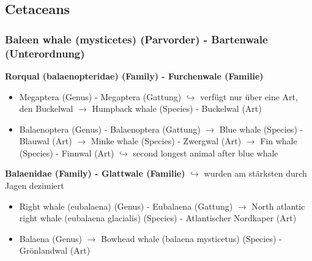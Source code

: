 \documentclass[12pt,a4paper]{article}
\begin{document}
\subsection{Cetaceans} %
\label{sub:cetaceans}

\subsubsection{Baleen whale (mysticetes) (Parvorder) - Bartenwale (Unterordnung)} %
\label{ssub:baleen_whale_mysticetes_parvorder_bartenwale_unterordnung_}

\textbf{Rorqual (balaenopteridae) (Family) - Furchenwale (Familie)}
\begin{itemize}
  \item Megaptera (Genus) - Megaptera (Gattung) 
  \newline \indent $\hookrightarrow$ verfügt nur über eine Art, den Buckelwal
      \newline \indent $\longrightarrow$ Humpback whale (Species) - Buckelwal (Art)
\end{itemize}
\begin{itemize}
  \item Balaenoptera (Genus) - Balaenoptera (Gattung)
    \newline \indent $\longrightarrow$ Blue whale (Species) - Blauwal (Art)
    \newline \indent $\longrightarrow$ Minke whale (Species) - Zwergwal (Art)
    \newline \indent $\longrightarrow$ Fin whale (Species) - Finnwal (Art)
    \newline \indent $\hookrightarrow$ second longest animal after blue whale 
\end{itemize}

\textbf{Balaenidae (Family) - Glattwale (Familie) }
\newline \indent $\hookrightarrow$ wurden am stärksten durch Jagen dezimiert
\begin{itemize}
  \item Right whale (eubalaena) (Genus) - Eubalaena (Gattung)
    \newline \indent $\longrightarrow$ North atlantic right whale (eubalaena glacialis) (Species) - Atlantischer Nordkaper (Art)

  \item Balaena (Genus)
    \newline \indent $\longrightarrow$ Bowhead whale (balaena mysticetus) (Species) - Grönlandwal (Art)
\end{itemize}
\end{document}
